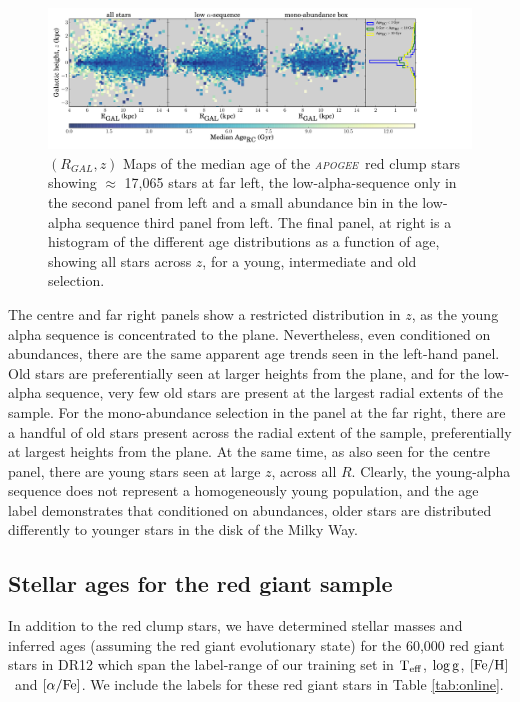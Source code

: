 \documentclass[12pt, preprint]{aastex}
\newcommand{\project}[1]{\textsl{#1}}
\newcommand{\apogee}{\project{\textsc{apogee}}}
\newcommand{\teff}{\mbox{$\rm T_{eff}$}}
\newcommand{\feh}{\mbox{$\rm [Fe/H]$}}
\newcommand{\alphafe}{\mbox{$\rm [\alpha/Fe]$}}
\newcommand{\logg}{\mbox{$\rm \log g$}}
\begin{document}
\begin{figure}[p]
\centering
        \includegraphics[scale=0.43]{./plots/agealphamap_hist.pdf}
    \caption{$(R_{GAL},z)$ Maps of the median age of the  \apogee\ red clump stars showing $\approx$ 17,065 stars at far left, the low-alpha-sequence only in the second panel from left and a small abundance bin in the low-alpha sequence third panel from left. The final panel, at right is a histogram of the different age distributions as a function of age, showing all stars across $z$, for a young, intermediate and old selection.  }
\label{fig:redclump_age}
\end{figure}

The centre and far right panels show a restricted distribution in  $z$, as the young alpha sequence is concentrated to the plane. Nevertheless, even conditioned on abundances, there are the same apparent age trends seen in the left-hand panel. Old stars are preferentially seen at larger heights from the plane, and for the low-alpha sequence, very few old stars are present at the largest radial extents of the sample. For the mono-abundance selection in the panel at the far right, there are a handful of old stars present across the radial extent of the sample, preferentially at largest heights from the plane. At the same time, as also seen for the centre panel, there are young stars seen at large $z$, across all $R$. Clearly, the young-alpha sequence does not represent a homogeneously young population, and the age label demonstrates that conditioned on abundances, older stars are distributed differently to younger stars in the disk of the Milky Way. 


\subsection{Stellar ages for the red giant sample}

In addition to the red clump stars, we have determined stellar masses and inferred ages (assuming the red giant evolutionary state) for the 60,000 red giant stars in DR12 which span the label-range of our training set in \teff, \logg, \feh\ and \alphafe. We include the labels for these red giant stars in Table \ref{tab:online}. 
\end{document}
